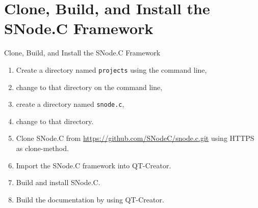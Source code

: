 \nosectionpage
\section{Clone, Build, and Install the SNode.C Framework}
\withsectionpage

\begin{frame}{Clone, Build, and Install the SNode.C Framework}
  \begin{enumerate}
    \item Create a directory named \lstinline|projects| using the command line,
    \item change to that directory on the command line,
    \item create a directory named \lstinline|snode.c|,
    \item change to that directory.
    \item Clone SNode.C from \alert{\href{https://github.com/SNodeC/snode.c.git}{https://github.com/SNodeC/snode.c.git}} using \alert{HTTPS} as clone-method.
    \item Import the SNode.C framework into QT-Creator.
    \item Build and install SNode.C.
    \item Build the documentation by using QT-Creator.
  \end{enumerate}
\end{frame}
